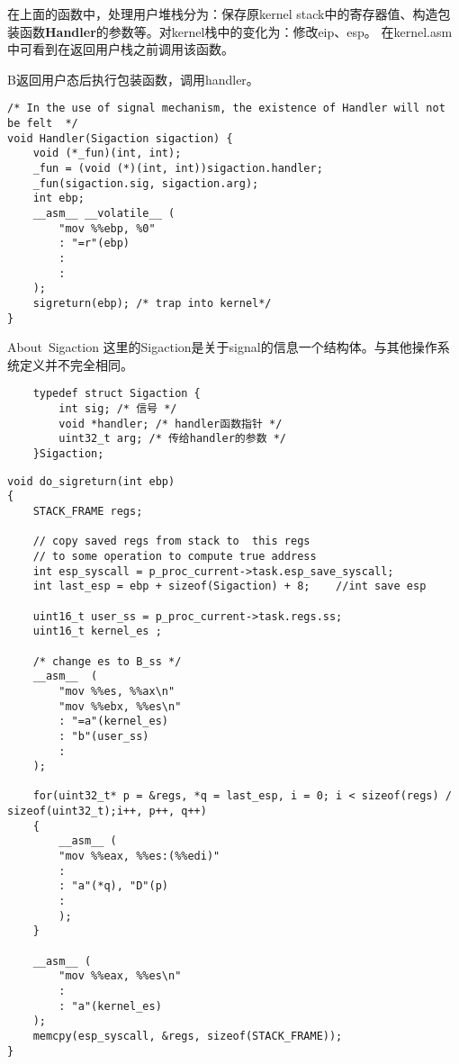 \documentclass[UTF8]{ctexart}
\begin{document}
在上面的函数中，处理用户堆栈分为：保存原kernel stack中的寄存器值、构造包装函数\textbf{Handler}的参数等。对kernel栈中的变化为：修改eip、esp。
在kernel.asm中可看到在返回用户栈之前调用该函数。

B返回用户态后执行包装函数，调用handler。

\begin{verbatim}
/* In the use of signal mechanism, the existence of Handler will not be felt  */
void Handler(Sigaction sigaction) {
    void (*_fun)(int, int);
    _fun = (void (*)(int, int))sigaction.handler;
    _fun(sigaction.sig, sigaction.arg);
    int ebp;
    __asm__ __volatile__ (
        "mov %%ebp, %0"
        : "=r"(ebp)
        : 
        :
    );
    sigreturn(ebp); /* trap into kernel*/
}
\end{verbatim}

\begin{mybox}{About\ Sigaction}
    这里的Sigaction是关于signal的信息一个结构体。与其他操作系统定义并不完全相同。
    \begin{verbatim}
    typedef struct Sigaction {
        int sig; /* 信号 */
        void *handler; /* handler函数指针 */
        uint32_t arg; /* 传给handler的参数 */
    }Sigaction;
    \end{verbatim}

\end{mybox}

\begin{verbatim}
void do_sigreturn(int ebp)
{
    STACK_FRAME regs;

    // copy saved regs from stack to  this regs
    // to some operation to compute true address
    int esp_syscall = p_proc_current->task.esp_save_syscall;
    int last_esp = ebp + sizeof(Sigaction) + 8;    //int save esp

    uint16_t user_ss = p_proc_current->task.regs.ss;
    uint16_t kernel_es ;

    /* change es to B_ss */
    __asm__  (
        "mov %%es, %%ax\n"
        "mov %%ebx, %%es\n"
        : "=a"(kernel_es)
        : "b"(user_ss)
        :
    );

    for(uint32_t* p = &regs, *q = last_esp, i = 0; i < sizeof(regs) / sizeof(uint32_t);i++, p++, q++)
    {
        __asm__ (
        "mov %%eax, %%es:(%%edi)"
        :
        : "a"(*q), "D"(p)
        :
        );
    }

    __asm__ (
        "mov %%eax, %%es\n"
        :
        : "a"(kernel_es)
    );
    memcpy(esp_syscall, &regs, sizeof(STACK_FRAME));
}

\end{verbatim}
\end{document}
